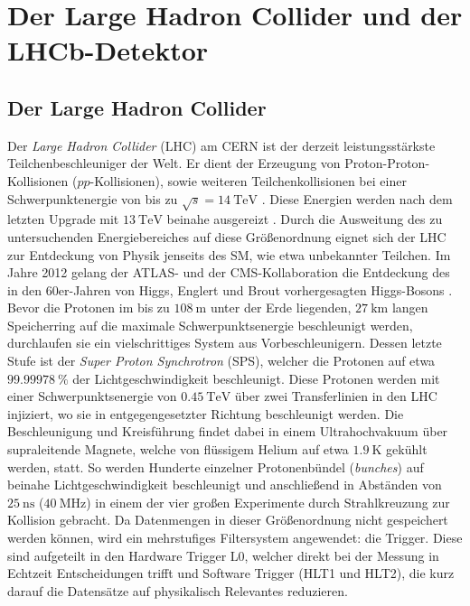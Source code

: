 \chapter{Der Large Hadron Collider und der LHCb-Detektor}
\label{chap:3}
%
\section{Der Large Hadron Collider}
%
Der \textit{Large Hadron Collider} (LHC) am CERN ist der derzeit leistungsstärkste Teilchenbeschleuniger der Welt. Er dient der Erzeugung von Proton-Proton-Kollisionen ($pp$-Kollisionen), sowie weiteren Teilchenkollisionen bei einer Schwerpunktenergie von bis zu $\sqrt{s}=\SI{14}{\tera\electronvolt}$ \cite{lhc}. Diese Energien werden nach dem letzten Upgrade mit $\SI{13}{\tera\electronvolt}$ beinahe ausgereizt \cite{lhc}. Durch die Ausweitung des zu untersuchenden Energiebereiches auf diese Größenordnung eignet sich der LHC zur Entdeckung von Physik jenseits des SM, wie etwa unbekannter Teilchen. Im Jahre 2012 gelang der ATLAS- und der CMS-Kollaboration die Entdeckung des in den 60er-Jahren von Higgs, Englert und Brout vorhergesagten Higgs-Bosons \cite{higgs_atlas, higgs_cms}.
Bevor die Protonen im bis zu $\SI{108}{\meter}$ unter der Erde liegenden, $\SI{27}{\kilo\meter}$ langen Speicherring auf die maximale Schwerpunktsenergie beschleunigt werden, durchlaufen sie ein vielschrittiges System aus Vorbeschleunigern. Dessen letzte Stufe ist der \textit{Super Proton Synchrotron} (SPS), welcher die Protonen auf etwa $\SI{99,99978}{\percent}$ der Lichtgeschwindigkeit beschleunigt\cite{lhc}. Diese Protonen werden mit einer Schwerpunktsenergie von $\SI{0,45}{\tera\electronvolt}$ über zwei Transferlinien in den LHC injiziert, wo sie in entgegengesetzter Richtung beschleunigt werden. Die Beschleunigung und Kreisführung findet dabei in einem Ultrahochvakuum über supraleitende Magnete, welche von flüssigem Helium auf etwa $\SI{1,9}{\kelvin}$ gekühlt werden, statt. So werden Hunderte einzelner Protonenbündel (\textit{bunches}) auf beinahe Lichtgeschwindigkeit beschleunigt und anschließend in Abständen von $\SI{25}{\nano\second}$
($\SI{40}{\mega\hertz}$) in einem der vier großen Experimente durch Strahlkreuzung zur Kollision gebracht. Da Datenmengen in dieser Größenordnung nicht gespeichert werden können, wird ein mehrstufiges Filtersystem angewendet: die Trigger. Diese sind aufgeteilt in den Hardware Trigger \textsc{L0}, welcher direkt bei der Messung in Echtzeit Entscheidungen trifft und Software Trigger (\textsc{HLT1} und \textsc{HLT2}), die kurz darauf die Datensätze auf physikalisch Relevantes reduzieren.
%
